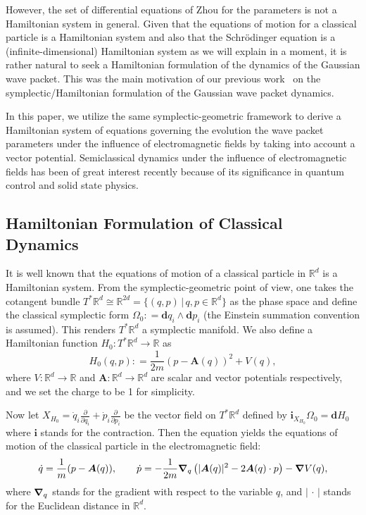 \documentclass[10pt]{article}
\def\defeq{\mathrel{\mathop:}=}
\newcommand{\vect}[1]{\boldsymbol{#1}}
\begin{document}
However, the set of differential equations of Zhou for the parameters is not a
Hamiltonian system in general. Given that the equations of motion for a
classical particle is a Hamiltonian system and also that the Schr\"odinger
equation is a (infinite-dimensional) Hamiltonian system as we will explain in a
moment, it is rather natural to seek a Hamiltonian formulation of the dynamics
of the Gaussian wave packet. This was the main motivation of our previous
work~\cite{OhLe2013} on the symplectic/Hamiltonian formulation of the Gaussian
wave packet dynamics.

In this paper, we utilize the same symplectic-geometric framework to derive a
Hamiltonian system of equations governing the evolution the wave packet
parameters under the influence of electromagnetic fields by taking into account
a vector potential. Semiclassical dynamics under the influence of
electromagnetic fields has been of great interest recently because of its
significance in quantum control and solid state physics.

\subsection{Hamiltonian Formulation of Classical Dynamics}
It is well known that the equations of motion of a classical particle in
$\mathbb{R}^{d}$ is a Hamiltonian system.
From the symplectic-geometric point of view, one takes the cotangent bundle
$T^{*}\mathbb{R}^{d} \cong \mathbb{R}^{2d} = \{ (q, p) \,|\, q, p \in \mathbb{R}^{d} \}$
as the phase space and define the classical symplectic form
$\Omega_{0} \defeq \mathbf{d}q_{i} \wedge \mathbf{d}p_{i}$
(the Einstein summation convention is assumed).
This renders $T^{*}\mathbb{R}^{d}$ a symplectic manifold.
We also define a Hamiltonian function $H_{0}\colon T^{*}\mathbb{R}^{d} \to \mathbb{R}$ as
\begin{equation}\label{eq:H_0}
	H_{0}(q,p) \defeq \frac{1}{2m}{(p - \vect{A}(q))}^{2} + V(q),
\end{equation}
where $V\colon \mathbb{R}^d \rightarrow \mathbb{R}$ and 
$\vect{A}\colon \mathbb{R}^d \rightarrow \mathbb{R}^d$ are scalar and vector
potentials respectively, and we set the charge to be 1 for simplicity.

Now let
$X_{H_{0}} = \dot{q}_{i} \frac{\partial}{\partial q_{i}} + \dot{p}_{i} \frac{\partial}{\partial p_{i}}$
be the vector field on $T^{*}\mathbb{R}^{d}$ defined by
$\textbf{i}_{X_{H_{0}}}\Omega_{0} =  \textbf{d}H_{0}$ where $\mathbf{i}$ stands
for the contraction. Then the equation yields the equations of motion of the
classical particle in the electromagnetic field:
\begin{equation}\label{eq:classical}
  \dot{q} = \frac{1}{m}(p - \vect{A}(q)),
  \qquad
  \dot{p} = -\frac{1}{2m} \grad_{q}\left( |\vect{A}(q)|^{2} - 2\vect{A}(q) \cdot p \right) - \grad V(q),
\end{equation}
where $\grad_{q}$ stands for the gradient with respect to the variable $q$, and
$|\,\cdot\,|$ stands for the Euclidean distance in $\mathbb{R}^{d}$.
\end{document}
